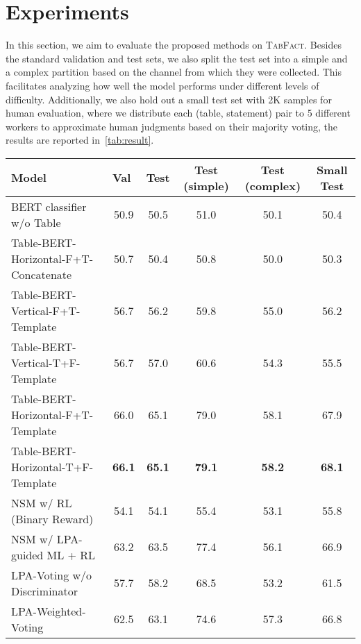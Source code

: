 \documentclass{article} \usepackage{iclr2020_conference,times}
\begin{document}
\section{Experiments}
\label{Sec:Experiments}
In this section, we aim to evaluate the proposed methods on \textsc{TabFact}. Besides the standard validation and test sets, we also split the test set into a simple and a complex partition based on the channel from which they were collected. This facilitates analyzing how well the model performs under different levels of difficulty. Additionally, we also hold out a small test set with 2K samples for human evaluation, where we distribute each (table, statement) pair to 5 different workers to approximate human judgments based on their majority voting, the results are reported in~\autoref{tab:result}.
\begin{table*}[thb]
\centering
\small
\begin{tabular}{lccccc} 
\toprule
Model & \multicolumn{1}{l}{Val} & \multicolumn{1}{l}{Test} & Test (simple) & Test (complex) & Small Test  \\ 
\midrule
BERT classifier w/o Table                  & 50.9                    & 50.5 & 51.0 &      50.1               & 50.4        \\ 
\midrule
Table-BERT-Horizontal-F+T-Concatenate   & 50.7           & 50.4          & 50.8          &  50.0          & 50.3                  \\
Table-BERT-Vertical-F+T-Template    & 56.7           & 56.2          & 59.8          &  55.0          & 56.2                \\
Table-BERT-Vertical-T+F-Template    & 56.7           & 57.0          & 60.6          &  54.3          & 55.5               \\ 
Table-BERT-Horizontal-F+T-Template  & 66.0           & 65.1          & 79.0          &  58.1          & 67.9               \\
Table-BERT-Horizontal-T+F-Template  & \textbf{66.1}  & \textbf{65.1} & \textbf{79.1} &  \textbf{58.2} & \textbf{68.1}      \\ 
\midrule
NSM w/ RL (Binary Reward) & 54.1 &  54.1 & 55.4 & 53.1  &  55.8 \\
NSM w/ LPA-guided ML + RL & 63.2 &  63.5 & 77.4 & 56.1  &  66.9 \\
LPA-Voting w/o Discriminator  &     57.7                &                 58.2 & 68.5  &  53.2        &       61.5     \\
LPA-Weighted-Voting  &          62.5     &  63.1    &   74.6 &    57.3       &         66.8   \\

\end{tabular}
\end{table*}
\end{document}
